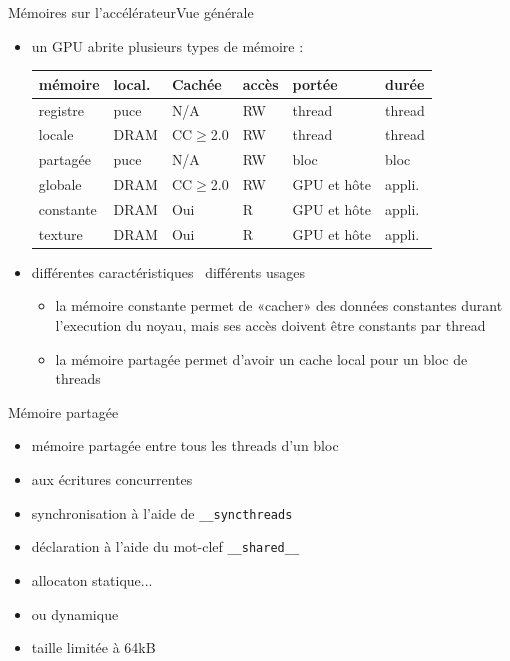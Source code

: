 \documentclass[11pt,mathserif]{beamer}
\newcommand{\scout}{\faAngellist}
\newcommand{\gezi}{\faLongArrowRight}
\newcommand{\argi}{\faLightbulbO}
\newcommand{\kontuz}{\faExclamationTriangle}
\newcommand{\harritu}{\faExclamation}
\begin{document}
\begin{frame}{Mémoires sur l'accélérateur}{Vue générale}
  \begin{itemize}[<+->]
    \item[\argi] un GPU abrite plusieurs types de mémoire : 
\begin{tabular}{|l|l|l|l|l|l|}
  \hline
  mémoire   & local. & Cachée  & accès     & portée   & durée \\ 
  \hline
  registre  & puce  &  N/A   & RW & thread & thread \\
  locale    & DRAM  & CC$\geqslant$2.0 & RW & thread & thread \\
  partagée  & puce  & N/A    & RW & bloc   & bloc \\
  globale   & DRAM  & CC$\geqslant$2.0  & RW & GPU et hôte &  appli. \\
  constante & DRAM  & Oui    & R  & GPU et hôte &  appli. \\
  texture   & DRAM  & Oui    & R  & GPU et hôte &  appli. \\
  \hline
\end{tabular}
  \item[\kontuz] différentes caractéristiques \gezi\ différents usages
    \begin{itemize} 
     \item la mémoire constante permet de «cacher» des données constantes durant l'execution du noyau, mais ses
       accès doivent être constants par thread 
     \item la mémoire partagée permet d'avoir un cache local pour un bloc de threads
  \end{itemize}
  \end{itemize}
\end{frame}

\begin{frame}{Mémoire partagée}
  \begin{itemize}[<+->]
    \item[\argi] mémoire partagée entre tous les threads d'un bloc
    \item[\kontuz] aux écritures concurrentes \harritu
    \item[\scout] synchronisation à l'aide de {\tt \_\_syncthreads } 
    \item[\scout] déclaration à l'aide du mot-clef {\tt \_\_shared\_\_}
    \item[\scout] allocaton statique...
  
\item[\scout] ou dynamique
  
   \item[\kontuz] taille limitée à 64kB
   \end{itemize}
\end{frame}
\end{document}
